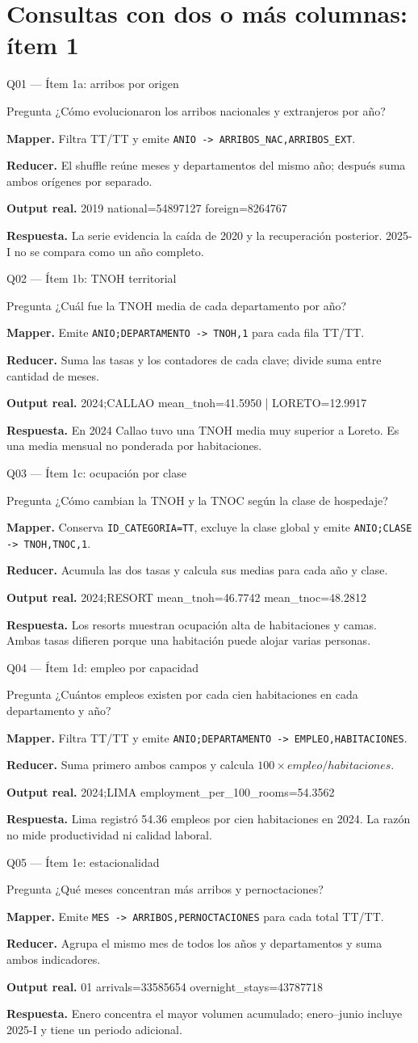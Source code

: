 \documentclass{beamer}
\newcommand{\queryframe}[6]{%
\begin{frame}{#1}
\footnotesize
\begin{alertblock}{Pregunta}
#2
\end{alertblock}
\textbf{Mapper.} #3

\vspace{0.45em}
\textbf{Reducer.} #4

\vspace{0.45em}
\textbf{Output real.} {\ttfamily\scriptsize #5}

\vspace{0.45em}
\textbf{Respuesta.} #6
\end{frame}
}
\begin{document}
\section{Consultas con dos o más columnas: ítem 1}

\queryframe{Q01 — Ítem 1a: arribos por origen}
{¿Cómo evolucionaron los arribos nacionales y extranjeros por año?}
{Filtra TT/TT y emite \texttt{ANIO -> ARRIBOS\_NAC,ARRIBOS\_EXT}.}
{El shuffle reúne meses y departamentos del mismo año; después suma ambos orígenes por separado.}
{2019 national=54897127 foreign=8264767}
{La serie evidencia la caída de 2020 y la recuperación posterior. 2025-I no se compara como un año completo.}

\queryframe{Q02 — Ítem 1b: TNOH territorial}
{¿Cuál fue la TNOH media de cada departamento por año?}
{Emite \texttt{ANIO;DEPARTAMENTO -> TNOH,1} para cada fila TT/TT.}
{Suma las tasas y los contadores de cada clave; divide suma entre cantidad de meses.}
{2024;CALLAO mean\_tnoh=41.5950 | LORETO=12.9917}
{En 2024 Callao tuvo una TNOH media muy superior a Loreto. Es una media mensual no ponderada por habitaciones.}

\queryframe{Q03 — Ítem 1c: ocupación por clase}
{¿Cómo cambian la TNOH y la TNOC según la clase de hospedaje?}
{Conserva \texttt{ID\_CATEGORIA=TT}, excluye la clase global y emite \texttt{ANIO;CLASE -> TNOH,TNOC,1}.}
{Acumula las dos tasas y calcula sus medias para cada año y clase.}
{2024;RESORT mean\_tnoh=46.7742 mean\_tnoc=48.2812}
{Los resorts muestran ocupación alta de habitaciones y camas. Ambas tasas difieren porque una habitación puede alojar varias personas.}

\queryframe{Q04 — Ítem 1d: empleo por capacidad}
{¿Cuántos empleos existen por cada cien habitaciones en cada departamento y año?}
{Filtra TT/TT y emite \texttt{ANIO;DEPARTAMENTO -> EMPLEO,HABITACIONES}.}
{Suma primero ambos campos y calcula $100\times empleo/habitaciones$.}
{2024;LIMA employment\_per\_100\_rooms=54.3562}
{Lima registró 54.36 empleos por cien habitaciones en 2024. La razón no mide productividad ni calidad laboral.}

\queryframe{Q05 — Ítem 1e: estacionalidad}
{¿Qué meses concentran más arribos y pernoctaciones?}
{Emite \texttt{MES -> ARRIBOS,PERNOCTACIONES} para cada total TT/TT.}
{Agrupa el mismo mes de todos los años y departamentos y suma ambos indicadores.}
{01 arrivals=33585654 overnight\_stays=43787718}
{Enero concentra el mayor volumen acumulado; enero--junio incluye 2025-I y tiene un periodo adicional.}
\end{document}
